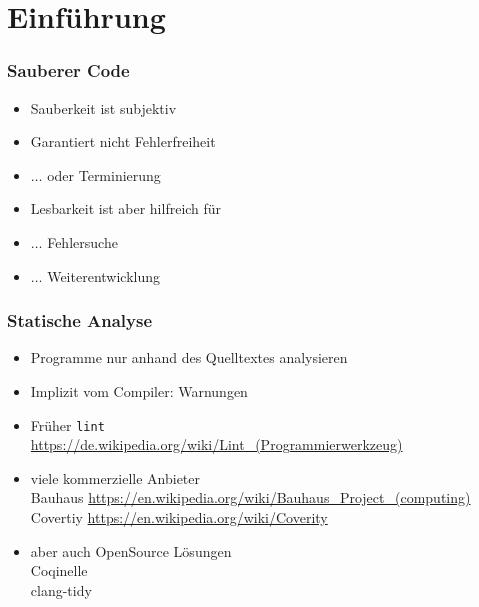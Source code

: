 \documentclass[aspectratio=169]{beamer}
\begin{document}
\section{Einführung}
\begin{frame}
  \frametitle{Sauberer Code}
  \begin{itemize}
  \item Sauberkeit ist subjektiv
    \pause %
  \item Garantiert nicht Fehlerfreiheit
    \pause
  \item $\ldots$ oder Terminierung
    \pause
  \item Lesbarkeit ist aber hilfreich für
    \pause
  \item $\ldots$ Fehlersuche
    \pause
  \item $\ldots$ Weiterentwicklung
    \pause
  \end{itemize}
\end{frame}
\begin{frame}
  \frametitle{Statische Analyse}
  \begin{itemize}
  \item Programme nur anhand des Quelltextes analysieren
    \pause
  \item Implizit vom Compiler: Warnungen
    \pause %
  \item Früher \texttt{lint} \\
    \qquad \url{https://de.wikipedia.org/wiki/Lint_(Programmierwerkzeug)}
    \pause
  \item viele kommerzielle Anbieter\\
    \qquad Bauhaus \url{https://en.wikipedia.org/wiki/Bauhaus_Project_(computing)}\\
    \pause
    \qquad Covertiy \url{https://en.wikipedia.org/wiki/Coverity}\\
    \pause
  \item aber auch OpenSource Lösungen\\
    \pause
    \qquad Coqinelle\\
    \pause
    \qquad clang-tidy
    \pause
  \end{itemize}
\end{frame}
\end{document}
